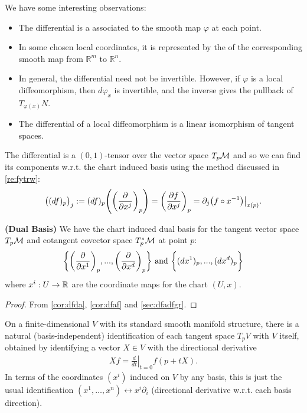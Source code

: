 \documentclass[12pt]{article} %
\newcommand{\bfs}[1]{\textbf{({#1}) }}
\begin{document}
\begin{rema}We have some interesting observations:
\begin{itemize}
\item The differential is a  associated to the smooth map $\varphi$ at each point. 
\item In some chosen local coordinates, it is represented by the  of the corresponding smooth map from $\mathbb{R}^{m}$ to $\mathbb{R}^{n}$. 
\item In general, the differential need not be invertible. However, if $\varphi$ is a local diffeomorphism, then $d \varphi_{x}$ is invertible, and the inverse gives the pullback of $T_{\varphi(x)} N$.
    \item The differential of a local diffeomorphism is a linear isomorphism of tangent spaces.
\end{itemize}

\end{rema}

The differential is a $(0,1)$-tensor over the vector space $T_p\mathcal{M}$ and so we can find its components w.r.t. the chart induced basis using the method discussed in \cref{re:fytrw}: 
\begin{align*} 
    \big((df)_p\big)_j := (df)_p \Bigg(\bigg( \frac{\partial}{\partial x^j} \bigg)_p\Bigg) = \bigg(\frac{\partial f}{\partial x^j}\bigg)_p = \partial_j \big( f\circ x^{-1}\big)\big|_{x(p)}.
\end{align*} 
    \begin{cora}\bfs{Dual Basis} We have the chart induced dual basis for the tangent vector space $T_p\mathcal{M}$  and cotangent covector space $T^*_p\mathcal{M}$  at point $p$:
$$\bigg\{ \bigg(\frac{\partial}{\partial x^1}\bigg)_p, ... , \bigg(\frac{\partial}{\partial x^d}\bigg)_p\bigg\} \text{ and } \bigg\{(d x^1)_p,...,(d x^d)_p \bigg\}$$
 where $x^i:U\to\mathbb{R}$ are the coordinate maps for the chart $(U,x)$.
\end{cora}
\begin{proof}
From \cref{cor:dfda}, \cref{cor:dfaf} and \cref{sec:dfadfgr}.
\end{proof}
\begin{cora}
On a finite-dimensional  $V$ with its standard smooth manifold structure, there is a natural (basis-independent) identification of each tangent space $T_{p} V$ with $V$ itself, obtained by identifying a vector $X \in V$ with the directional derivative
\begin{align*}
X f=\left.\frac{d}{d t}\right|_{t=0} f(p+t X) .
\end{align*}
In terms of the coordinates $\left(x^{i}\right)$ induced on $V$ by any basis, this is just the usual identification $\left(x^{1}, \ldots, x^{n}\right) \leftrightarrow x^{i} \partial_{i}$ (directional derivative w.r.t. each basis direction).
\end{cora}
\end{document}
